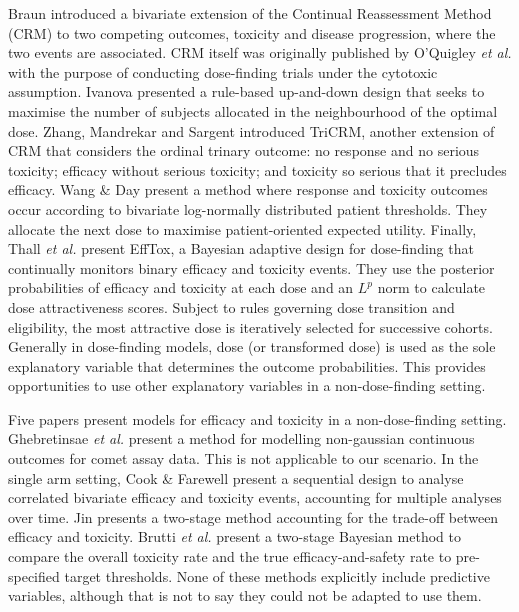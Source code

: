 \documentclass{article}
\begin{document}
Braun\cite{Braun2002} introduced a bivariate extension of the Continual Reassessment Method (CRM) to two competing outcomes, toxicity and disease progression, where the two events are associated.
CRM itself was originally published by O'Quigley \textit{et al.}\cite{OQuigley1990} with the purpose of conducting dose-finding trials under the cytotoxic assumption.
Ivanova\cite{Ivanova2003} presented a rule-based up-and-down design that seeks to maximise the number of subjects allocated in the neighbourhood of the optimal dose.
Zhang, Mandrekar and Sargent\cite{Zhang2006, Mandrekar2010} introduced TriCRM, another extension of CRM that considers the ordinal trinary outcome: no response and no serious toxicity; efficacy without serious toxicity; and toxicity so serious that it precludes efficacy.
Wang \& Day\cite{Wang2010} present a method where response and toxicity outcomes occur according to bivariate log-normally distributed patient thresholds.
They allocate the next dose to maximise patient-oriented expected utility.
Finally, Thall \textit{et al.}\cite{Thall2004, Cook2006, Thall2006} present EffTox, a Bayesian adaptive design for dose-finding that continually monitors binary efficacy and toxicity events.
They use the posterior probabilities of efficacy and toxicity at each dose and an $L^p$ norm to calculate dose attractiveness scores.
Subject to rules governing dose transition and eligibility, the most attractive dose is iteratively selected for successive cohorts.
Generally in dose-finding models, dose (or transformed dose) is used as the sole explanatory variable that determines the outcome probabilities.
This provides opportunities to use other explanatory variables in a non-dose-finding setting.

Five papers present models for efficacy and toxicity in a non-dose-finding setting.
Ghebretinsae \textit{et al.}\cite{Ghebretinsae2012} present a method for modelling non-gaussian continuous outcomes for comet assay data.
This is not applicable to our scenario.
In the single arm setting, Cook \& Farewell \cite{Cook1994} present a sequential design to analyse correlated bivariate efficacy and toxicity events, accounting for multiple analyses over time.
Jin\cite{Jin2007} presents a two-stage method accounting for the trade-off between efficacy and toxicity.
Brutti \textit{et al.}\cite{Brutti2011} present a two-stage Bayesian method to compare the overall toxicity rate and the true efficacy-and-safety rate to pre-specified target thresholds.
None of these methods explicitly include predictive variables, although that is not to say they could not be adapted to use them.
\end{document}
